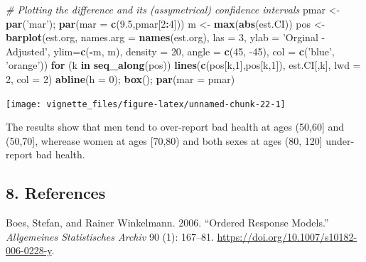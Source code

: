 \documentclass[]{article}
\newenvironment{Shaded}{\begin{snugshade}}{\end{snugshade}}
\newcommand{\CommentTok}[1]{\textcolor[rgb]{0.56,0.35,0.01}{\textit{#1}}}
\newcommand{\ControlFlowTok}[1]{\textcolor[rgb]{0.13,0.29,0.53}{\textbf{#1}}}
\newcommand{\DataTypeTok}[1]{\textcolor[rgb]{0.13,0.29,0.53}{#1}}
\newcommand{\DecValTok}[1]{\textcolor[rgb]{0.00,0.00,0.81}{#1}}
\newcommand{\FloatTok}[1]{\textcolor[rgb]{0.00,0.00,0.81}{#1}}
\newcommand{\KeywordTok}[1]{\textcolor[rgb]{0.13,0.29,0.53}{\textbf{#1}}}
\newcommand{\NormalTok}[1]{#1}
\newcommand{\OperatorTok}[1]{\textcolor[rgb]{0.81,0.36,0.00}{\textbf{#1}}}
\newcommand{\StringTok}[1]{\textcolor[rgb]{0.31,0.60,0.02}{#1}}
\begin{document}
\begin{Shaded}
\begin{Highlighting}[]
\CommentTok{# Plotting the difference and its (assymetrical) confidence intervals}
\NormalTok{pmar <-}\StringTok{ }\KeywordTok{par}\NormalTok{(}\StringTok{'mar'}\NormalTok{); }\KeywordTok{par}\NormalTok{(}\DataTypeTok{mar =} \KeywordTok{c}\NormalTok{(}\FloatTok{9.5}\NormalTok{,pmar[}\DecValTok{2}\OperatorTok{:}\DecValTok{4}\NormalTok{]))}
\NormalTok{m <-}\StringTok{ }\KeywordTok{max}\NormalTok{(}\KeywordTok{abs}\NormalTok{(est.CI))}
\NormalTok{pos <-}\StringTok{ }\KeywordTok{barplot}\NormalTok{(est.org, }\DataTypeTok{names.arg =} \KeywordTok{names}\NormalTok{(est.org), }\DataTypeTok{las =} \DecValTok{3}\NormalTok{, }\DataTypeTok{ylab =} \StringTok{'Orginal - Adjusted'}\NormalTok{, }
               \DataTypeTok{ylim=}\KeywordTok{c}\NormalTok{(}\OperatorTok{-}\NormalTok{m, m), }\DataTypeTok{density =} \DecValTok{20}\NormalTok{, }\DataTypeTok{angle =} \KeywordTok{c}\NormalTok{(}\DecValTok{45}\NormalTok{, }\DecValTok{-45}\NormalTok{), }\DataTypeTok{col =} \KeywordTok{c}\NormalTok{(}\StringTok{'blue'}\NormalTok{, }\StringTok{'orange'}\NormalTok{))}
\ControlFlowTok{for}\NormalTok{ (k }\ControlFlowTok{in} \KeywordTok{seq_along}\NormalTok{(pos)) }\KeywordTok{lines}\NormalTok{(}\KeywordTok{c}\NormalTok{(pos[k,}\DecValTok{1}\NormalTok{],pos[k,}\DecValTok{1}\NormalTok{]), est.CI[,k], }\DataTypeTok{lwd =} \DecValTok{2}\NormalTok{, }\DataTypeTok{col =} \DecValTok{2}\NormalTok{)}
\KeywordTok{abline}\NormalTok{(}\DataTypeTok{h =} \DecValTok{0}\NormalTok{); }\KeywordTok{box}\NormalTok{(); }\KeywordTok{par}\NormalTok{(}\DataTypeTok{mar =}\NormalTok{ pmar)}
\end{Highlighting}
\end{Shaded}

\begin{center}\texttt{[image: vignette\_files/figure-latex/unnamed-chunk-22-1]} \end{center}

The results show that men tend to over-report bad health at ages
(50,60{]} and (50,70{]}, wherease women at ages {[}70,80) and both sexes
at ages (80, 120{]} under-report bad health.

\hypertarget{references}{%
\subsection*{8. References}\label{references}}

\hypertarget{refs}{}
\leavevmode\hypertarget{ref-Boes2006}{}%
Boes, Stefan, and Rainer Winkelmann. 2006. ``Ordered Response Models.''
\emph{Allgemeines Statistisches Archiv} 90 (1): 167--81.
\url{https://doi.org/10.1007/s10182-006-0228-y}.
\end{document}
